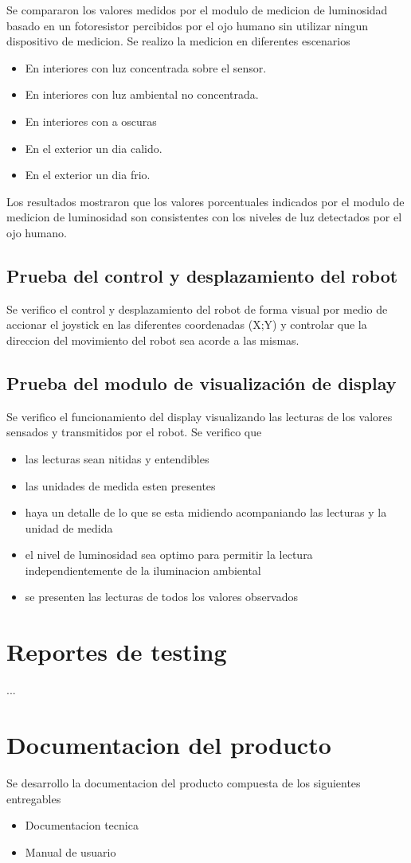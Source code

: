 Se compararon los valores medidos por el modulo de medicion de luminosidad basado en un fotoresistor percibidos por el ojo humano sin utilizar ningun dispositivo de medicion. Se realizo la medicion en diferentes escenarios

\begin{itemize}
	\item En interiores con luz concentrada sobre el sensor.
	\item En interiores con luz ambiental no concentrada.
	\item En interiores con a oscuras
	\item En el exterior un dia calido.
	\item En el exterior un dia frio.
\end{itemize}

Los resultados mostraron que los valores porcentuales indicados por el modulo de medicion de luminosidad son consistentes con los niveles de luz detectados por el ojo humano.

\subsection{Prueba del control y desplazamiento del robot}

Se verifico el control y desplazamiento del robot de forma visual por medio de accionar el joystick en las diferentes coordenadas (X;Y) y controlar que la direccion del movimiento del robot sea acorde a las mismas.


\subsection{Prueba del modulo de visualización de display}

Se verifico el funcionamiento del display visualizando las lecturas de los valores sensados y transmitidos por el robot. Se verifico que 

\begin{itemize}
	\item las lecturas sean nitidas y entendibles
	\item las unidades de medida esten presentes
	\item haya un detalle de lo que se esta midiendo acompaniando las lecturas y la unidad de medida
	\item el nivel de luminosidad sea optimo para permitir la lectura independientemente de la iluminacion ambiental
	\item se presenten las lecturas de todos los valores observados 
\end{itemize}

\section{Reportes de testing}

...


\section{Documentacion del producto }

Se desarrollo la documentacion del producto compuesta de los siguientes entregables
\begin{itemize}
	\item Documentacion tecnica
	\item Manual de usuario
\end{itemize}




